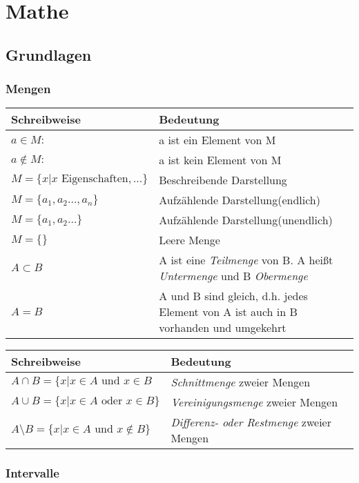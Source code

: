 \chapter{Mathe}
\section{Grundlagen}
\subsection{Mengen}

\noindent\begin{tabularx}{\textwidth}{lX}

\toprule
 Schreibweise & Bedeutung \\
\midrule
$a \in M:$ & a ist ein Element von M \\
$a \not \in M:$ & a ist kein Element von M \\
$M=\{x | x \text{ Eigenschaften},\ldots\}$ & Beschreibende Darstellung \\
$M=\{a_1,a_2\ldots,a_n\}$ &Aufzählende Darstellung(endlich) \\
$M=\{a_1,a_2\ldots\}$ & Aufzählende Darstellung(unendlich) \\
$M=\{\}$ &Leere Menge \\
$A\subset B$ & A ist eine \emph{Teilmenge} von B. A heißt \emph{Untermenge} und B \emph{Obermenge}\\
$A=B$ & A und B sind gleich, d.h. jedes Element von A ist auch in B vorhanden und umgekehrt\\
\bottomrule
\end{tabularx}


\noindent\begin{tabularx}{\textwidth}{lX}
\toprule
 Schreibweise & Bedeutung \\
\midrule
$A\cap B=\{x|x\in A \text{ und } x\in B$ & \emph{Schnittmenge} zweier Mengen \\
$A\cup B=\{x|x\in A \text{ oder } x\in B\}$ & \emph{Vereinigungsmenge} zweier Mengen \\
$A\setminus B=\{x|x\in A \text{ und } x\not \in B\}$ & \emph{Differenz- oder Restmenge} zweier Mengen \\
\bottomrule
\end{tabularx}


\subsection{Intervalle}

